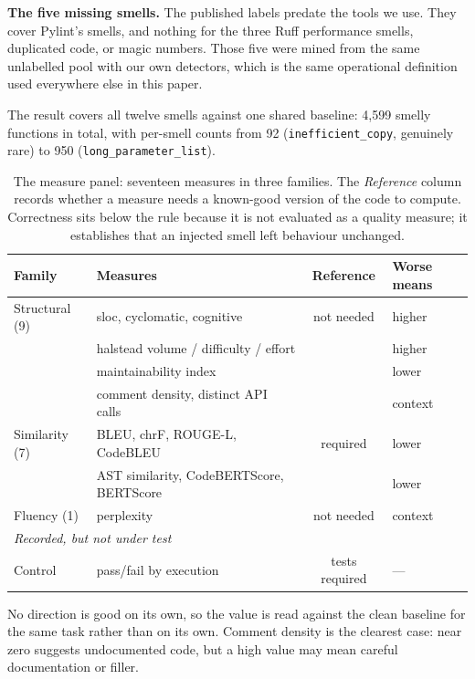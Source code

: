 \documentclass[10pt,a4paper,twocolumn]{article}
\begin{document}
\textbf{The five missing smells.} The published labels predate the tools we use.
They cover Pylint's smells, and nothing for the three Ruff performance smells,
duplicated code, or magic numbers. Those five were mined from the same unlabelled
pool with our own detectors, which is the same operational definition used
everywhere else in this paper.

The result covers all twelve smells against one shared baseline: 4{,}599
smelly functions in total, with per-smell counts from 92
(\texttt{inefficient\_copy}, genuinely rare) to 950
(\texttt{long\_parameter\_list}).

\begin{table}[!tb]
\centering
\small
\begin{threeparttable}
\begin{tabular}{llcl}
\toprule
Family & Measures & Reference & Worse means \\
\midrule
Structural (9) & sloc, cyclomatic, cognitive & not needed & higher \\
           & halstead volume / difficulty / effort & & higher \\
           & maintainability index & & lower \\
           & comment density, distinct API calls & & context\tnote{$\dagger$} \\
Similarity (7) & BLEU, chrF, ROUGE-L, CodeBLEU & required & lower \\
           & AST similarity, CodeBERTScore, BERTScore & & lower \\
Fluency (1) & perplexity & not needed & context\tnote{$\dagger$} \\
\midrule
\multicolumn{4}{l}{\emph{Recorded, but not under test}} \\
Control    & pass/fail by execution & tests required & --- \\
\bottomrule
\end{tabular}
\begin{tablenotes}[flushleft]
\footnotesize
\item[$\dagger$] No direction is good on its own, so the value is read against
the clean baseline for the same task rather than on its own. Comment density is
the clearest case: near zero suggests undocumented code, but a high value may mean
careful documentation or filler.
\end{tablenotes}
\end{threeparttable}
\caption{The measure panel: seventeen measures in three families. The
\emph{Reference} column records whether a measure needs a known-good version of
the code to compute. Correctness sits below the rule because it is not evaluated
as a quality measure; it establishes that an injected smell left behaviour
unchanged.}
\label{tab:panel}
\end{table}
\end{document}
